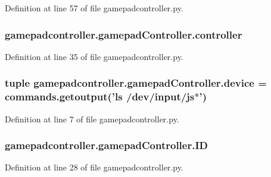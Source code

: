 Definition at line 57 of file gamepadcontroller.\-py.

\hypertarget{classgamepadcontroller_1_1gamepadController_a10b7595ea5c2655a9ed3ddba6f62424d}{
\subsubsection[{controller}]{\setlength{\rightskip}{0pt plus 5cm}gamepadcontroller.\-gamepad\-Controller.\-controller}}\label{classgamepadcontroller_1_1gamepadController_a10b7595ea5c2655a9ed3ddba6f62424d}


Definition at line 35 of file gamepadcontroller.\-py.

\hypertarget{classgamepadcontroller_1_1gamepadController_a2058f8060f1d8406118bcf0bb5e18729}{
\subsubsection[{device}]{\setlength{\rightskip}{0pt plus 5cm}tuple gamepadcontroller.\-gamepad\-Controller.\-device = commands.\-getoutput('ls /dev/input/js$\ast$')\hspace{0.3cm}{\ttfamily [static]}}}\label{classgamepadcontroller_1_1gamepadController_a2058f8060f1d8406118bcf0bb5e18729}


Definition at line 7 of file gamepadcontroller.\-py.

\hypertarget{classgamepadcontroller_1_1gamepadController_a3f5663a47a7792c7efeee56d86eaf641}{
\subsubsection[{I\-D}]{\setlength{\rightskip}{0pt plus 5cm}gamepadcontroller.\-gamepad\-Controller.\-I\-D}}\label{classgamepadcontroller_1_1gamepadController_a3f5663a47a7792c7efeee56d86eaf641}


Definition at line 28 of file gamepadcontroller.\-py.

